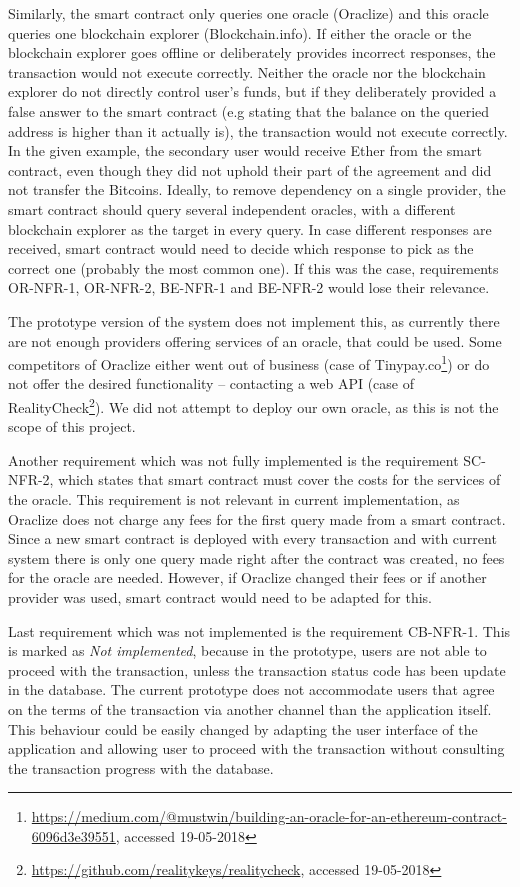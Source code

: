 Similarly, the smart contract only queries one oracle (Oraclize) and this oracle queries one blockchain explorer (Blockchain.info). If either the oracle or the blockchain explorer goes offline or deliberately provides incorrect responses, the transaction would not execute correctly. Neither the oracle nor the blockchain explorer do not directly control user's funds, but if they deliberately provided a false answer to the smart contract (e.g stating that the balance on the queried address is higher than it actually is), the transaction would not execute correctly. In the given example, the secondary user would receive Ether from the smart contract, even though they did not uphold their part of the agreement and did not transfer the Bitcoins. Ideally, to remove dependency on a single provider, the smart contract should query several independent oracles, with a different blockchain explorer as the target in every query. In case different responses are received, smart contract would need to decide which response to pick as the correct one (probably the most common one). If this was the case, requirements OR-NFR-1, OR-NFR-2, BE-NFR-1 and BE-NFR-2 would lose their relevance.

The prototype version of the system does not implement this, as currently there are not enough providers offering services of an oracle, that could be used. Some competitors of Oraclize either went out of business (case of Tinypay.co\footnote{\url{https://medium.com/@mustwin/building-an-oracle-for-an-ethereum-contract-6096d3e39551}, accessed 19-05-2018}) or do not offer the desired functionality -- contacting a web API (case of RealityCheck\footnote{\url{https://github.com/realitykeys/realitycheck}, accessed 19-05-2018}). We did not attempt to deploy our own oracle, as this is not the scope of this project.

Another requirement which was not fully implemented is the requirement SC-NFR-2, which states that smart contract must cover the costs for the services of the oracle. This requirement is not relevant in current implementation, as Oraclize does not charge any fees for the first query made from a smart contract. Since a new smart contract is deployed with every transaction and with current system there is only one query made right after the contract was created, no fees for the oracle are needed. However, if Oraclize changed their fees or if another provider was used, smart contract would need to be adapted for this.

Last requirement which was not implemented is the requirement CB-NFR-1. This is marked as \textit{Not implemented}, because in the prototype, users are not able to proceed with the transaction, unless the transaction status code has been update in the database. The current prototype does not accommodate users that agree on the terms of the transaction via another channel than the application itself. This behaviour could be easily changed by adapting the user interface of the application and allowing user to proceed with the transaction without consulting the transaction progress with the database.
%
%
%
%
%

